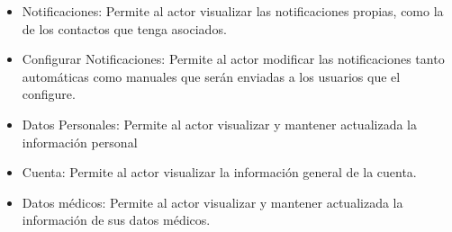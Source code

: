 \begin{itemize}
	\item Notificaciones: Permite al actor visualizar las notificaciones propias, como la de los contactos que tenga asociados.
	\item Configurar Notificaciones: Permite al actor modificar las notificaciones tanto automáticas como manuales que serán enviadas a los usuarios que el configure.
	\item Datos Personales: Permite al actor visualizar y mantener actualizada la información personal 
	\item Cuenta: Permite al actor visualizar la información general de la cuenta.
	\item Datos médicos: Permite al actor visualizar y mantener actualizada la información de sus datos médicos.
\end{itemize}


\pagebreak